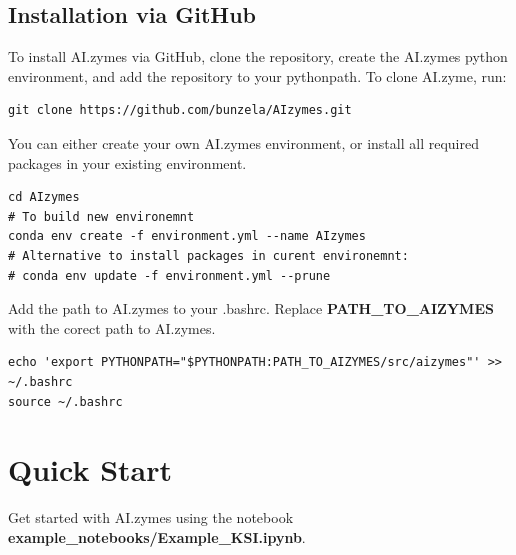 \documentclass[10pt]{extarticle}
\let\oldsection\section
\renewcommand{\section}[1]{\clearpage\oldsection{#1}}
\begin{document}
\subsection{Installation via GitHub}

To install AI.zymes via GitHub, clone the repository, create the AI.zymes python environment, and add the repository to your pythonpath. To clone AI.zyme, run:

\vspace*{0.5\baselineskip}
\begin{lstlisting}[basicstyle=\color{black}\fontsize{9}{11}\selectfont\ttfamily, frame=single, rulecolor=\color{black}, breaklines=true]
git clone https://github.com/bunzela/AIzymes.git
\end{lstlisting}
\vspace*{0.5\baselineskip}

You can either create your own AI.zymes environment, or install all required packages in your existing environment.

\vspace*{0.5\baselineskip}
\begin{lstlisting}[basicstyle=\color{black}\fontsize{9}{11}\selectfont\ttfamily, frame=single, rulecolor=\color{black}, breaklines=true]
cd AIzymes
# To build new environemnt
conda env create -f environment.yml --name AIzymes 
# Alternative to install packages in curent environemnt:
# conda env update -f environment.yml --prune
\end{lstlisting}
\vspace*{0.5\baselineskip}

Add the path to AI.zymes to your .bashrc. Replace \textbf{PATH\_TO\_AIZYMES} with the corect path to AI.zymes.

\vspace*{0.5\baselineskip}
\begin{lstlisting}[basicstyle=\color{black}\fontsize{9}{11}\selectfont\ttfamily, frame=single, rulecolor=\color{black}, breaklines=true]
echo 'export PYTHONPATH="$PYTHONPATH:PATH_TO_AIZYMES/src/aizymes"' >> ~/.bashrc
source ~/.bashrc
\end{lstlisting}
\vspace*{0.5\baselineskip}\section{Quick Start}

\begin{tcolorbox}[colback=mpgAccentCyan!20!white,colframe=mpgAccentCyan!80!black,title=Tip]
Get started with AI.zymes using the notebook \textbf{example\_notebooks/Example\_KSI.ipynb}.
\end{tcolorbox}
\end{document}
